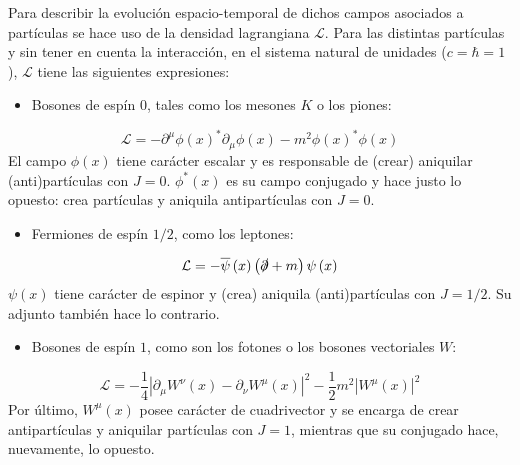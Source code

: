 Para describir la evolución espacio-temporal de dichos campos asociados a partículas se hace uso de la densidad lagrangiana $\mathcal{L}$. Para las distintas partículas y sin tener en cuenta la interacción, en el sistema natural de unidades ($c=\hbar =1$), $\mathcal{L}$ tiene las siguientes expresiones:
\begin{itemize}
\item Bosones de espín $0$, tales como los mesones $K$ o los piones:
\end{itemize}
\begin{equation*}
\mathcal{L}=-\partial ^{\mu }\phi \left( x\right) ^{\ast }\partial_{\mu} \phi \left( x\right) -m^{2}\phi \left( x\right) ^{\ast }\phi \left( x\right)
\end{equation*}
El campo $\phi(x)$ tiene carácter escalar y es responsable de (crear) aniquilar (anti)partículas con $J=0$. $\phi^{\ast}(x)$ es su campo conjugado y hace justo lo opuesto: crea partículas y aniquila antipartículas con $J=0$.
\begin{itemize}
\item Fermiones de espín $1/2$, como los leptones:
\end{itemize}
\begin{equation*}
\mathcal{L}=-\overline{\psi }\left( x\right) \left( \slashed{\partial}+m\right) \psi \left( x\right)
\end{equation*}
$\psi(x)$ tiene carácter de espinor y (crea) aniquila (anti)partículas con $J=1/2$. Su adjunto también hace lo contrario.
\begin{itemize}
\item Bosones de espín $1$, como son los fotones o los bosones vectoriales $W$:
\end{itemize}
\begin{equation*}
\mathcal{L}=-\dfrac{1}{4}\left| \partial _{\mu }W^{\nu }\left( x\right) -\partial _{\nu }W^{\mu }\left( x\right) \right| ^{2}-\dfrac{1}{2}m^{2}\left| W^{\mu }\left( x\right) \right| ^{2}
\end{equation*}
Por último, $W^{\mu}(x)$ posee carácter de cuadrivector y se encarga de crear antipartículas y aniquilar partículas con $J=1$, mientras que su conjugado hace, nuevamente, lo opuesto.

